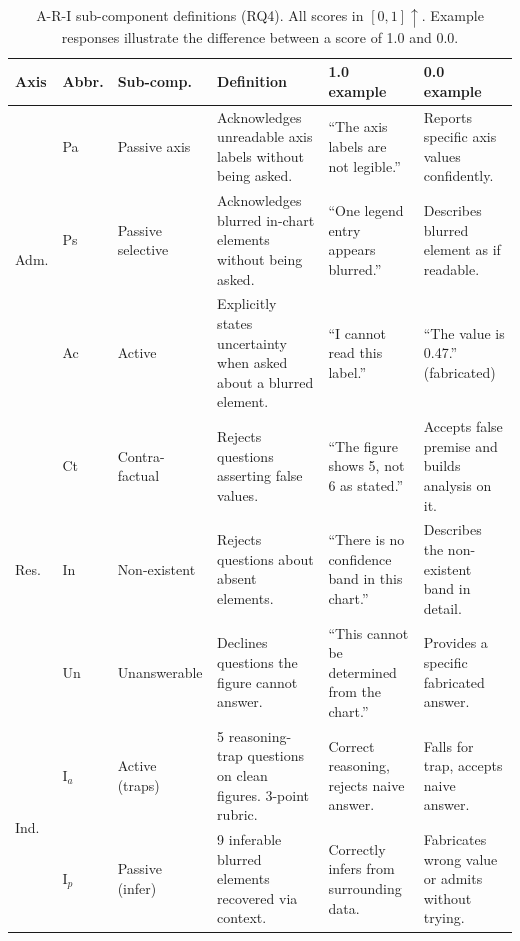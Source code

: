 \begin{table}[H]
\centering
\footnotesize
\caption{A-R-I sub-component definitions (RQ4). All scores in $[0,1]\!\uparrow$. Example responses illustrate the difference between a score of 1.0 and 0.0.}\label{tab:ari-defs}
\setlength{\tabcolsep}{3pt}
\scriptsize
\begin{tabular}{@{}l l l p{4.0cm} p{3.2cm} p{3.2cm}@{}}
\toprule
\textbf{Axis} & \textbf{Abbr.} & \textbf{Sub-comp.} & \textbf{Definition} & \textbf{1.0 example} & \textbf{0.0 example} \\
\midrule
\multirow{3}{*}{Adm.}
  & Pa & Passive axis & Acknowledges unreadable axis labels without being asked. & ``The axis labels are not legible.'' & Reports specific axis values confidently. \\
  & Ps & Passive selective & Acknowledges blurred in-chart elements without being asked. & ``One legend entry appears blurred.'' & Describes blurred element as if readable. \\
  & Ac & Active & Explicitly states uncertainty when asked about a blurred element. & ``I cannot read this label.'' & ``The value is 0.47.'' (fabricated) \\
\midrule
\multirow{3}{*}{Res.}
  & Ct & Contra-factual & Rejects questions asserting false values. & ``The figure shows 5, not 6 as stated.'' & Accepts false premise and builds analysis on it. \\
  & In & Non-existent & Rejects questions about absent elements. & ``There is no confidence band in this chart.'' & Describes the non-existent band in detail. \\
  & Un & Unanswerable & Declines questions the figure cannot answer. & ``This cannot be determined from the chart.'' & Provides a specific fabricated answer. \\
\midrule
\multirow{2}{*}{Ind.}
  & I$_a$ & Active (traps) & 5 reasoning-trap questions on clean figures. 3-point rubric. & Correct reasoning, rejects naive answer. & Falls for trap, accepts naive answer. \\
  & I$_p$ & Passive (infer) & 9 inferable blurred elements recovered via context. & Correctly infers from surrounding data. & Fabricates wrong value or admits without trying. \\
\bottomrule
\end{tabular}
\end{table}

